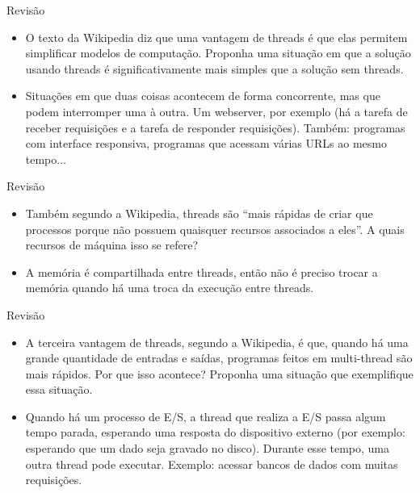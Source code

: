 \documentclass{beamer}
\begin{document}
\begin{frame}[fragile]{Revisão}
  \centering
  \Large
  \begin{itemize}
    \item O texto da Wikipedia diz que uma vantagem de threads é que elas
      permitem simplificar modelos de computação. Proponha uma situação em que a
      solução usando threads é significativamente mais simples que a solução sem
      threads.

    \item <2-> Situações em que duas coisas acontecem de forma concorrente, mas
      que podem interromper uma à outra. Um webserver, por exemplo (há a
      tarefa de receber requisições e a tarefa de responder requisições).
      Também: programas com interface responsiva, programas que acessam várias
      URLs ao mesmo tempo...
  \end{itemize}
\end{frame}


\begin{frame}[fragile]{Revisão}
  \centering
  \Large
  \begin{itemize}
    \item Também segundo a Wikipedia, threads são ``mais rápidas de criar que
      processos porque não possuem quaisquer recursos associados a eles''. A
      quais recursos de máquina isso se refere?

    \item <2-> A memória é compartilhada entre threads, então não é preciso
      trocar a memória quando há uma troca da execução entre threads.
  \end{itemize}
\end{frame}

\begin{frame}[fragile]{Revisão}
  \centering
  \Large
  \begin{itemize}
    \item A terceira vantagem de threads, segundo a Wikipedia, é que, quando há
      uma grande quantidade de entradas e saídas, programas feitos em
      multi-thread são mais rápidos. Por que isso acontece? Proponha uma
      situação que exemplifique essa situação.

    \item <2-> Quando há um processo de E/S, a thread que realiza a E/S passa
      algum tempo parada, esperando uma resposta do dispositivo externo (por
      exemplo: esperando que um dado seja gravado no disco). Durante esse tempo,
      uma outra thread pode executar. Exemplo: acessar bancos de dados com
      muitas requisições.
  \end{itemize}
\end{frame}
\end{document}

